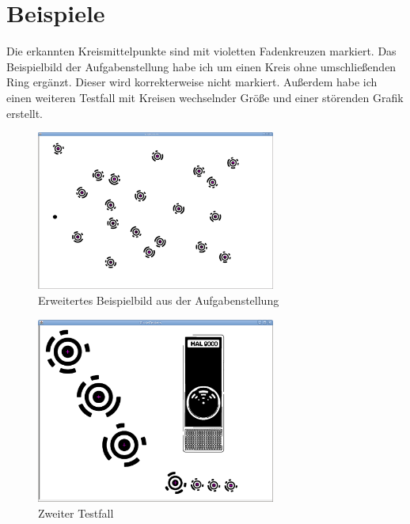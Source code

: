 \section{Beispiele}
Die erkannten Kreismittelpunkte sind mit violetten Fadenkreuzen markiert. Das Beispielbild der Aufgabenstellung habe ich um einen Kreis ohne umschließenden Ring ergänzt. Dieser wird korrekterweise nicht markiert. Außerdem habe ich einen weiteren Testfall mit Kreisen wechselnder Größe und einer störenden Grafik erstellt.
\begin{figure}[!ht]
	\centering	
	\includegraphics[width=0.7\textwidth]{Grafiken/sek1bsp1}
	\caption{Erweitertes Beispielbild aus der Aufgabenstellung}
\end{figure}
\vfill{}
\begin{figure}[!ht]
	\centering	
	\includegraphics[width=0.7\textwidth]{Grafiken/sek1bsp2}
	\caption{Zweiter Testfall}
\end{figure}
